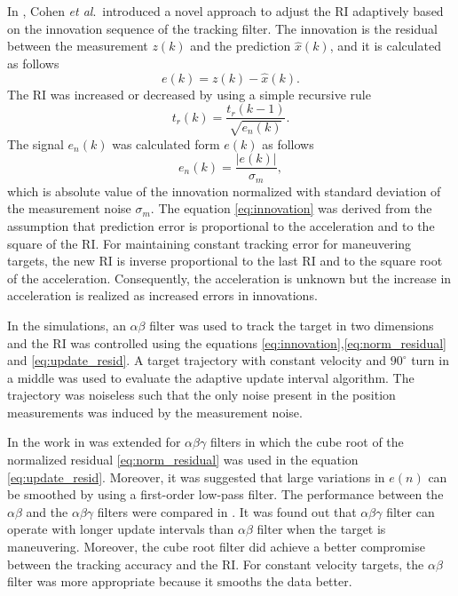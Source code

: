 \documentclass[english, 12pt, a4paper, elec, utf8, a-1b, online]{aaltothesis}
\newcommand{\etal}{\textit{et al}.~}
\begin{document}
In \cite{Cohen1986}, Cohen \etal introduced a novel approach to adjust the RI adaptively based on the innovation sequence of the tracking filter.
The innovation is the residual between the measurement $z(k)$ and the prediction $\hat{x}(k)$, and it is calculated as follows
\begin{equation}\label{eq:innovation}
    e(k) = z(k) - \hat{x}(k).
\end{equation}
The RI was increased or decreased by using a simple recursive rule 
\begin{equation}\label{eq:update_resid}
    t_r(k) = \frac{t_r(k-1)}{\sqrt{e_n(k)}}.
\end{equation}
The signal $e_n(k)$ was calculated form $e(k)$ as follows
\begin{equation}\label{eq:norm_residual}
    e_n(k) = \frac{|e(k)|}{\sigma_m},
\end{equation}
which is absolute value of the innovation normalized with standard deviation of the measurement noise $\sigma_m$.
The equation \eqref{eq:innovation} was derived from the assumption that prediction error is proportional to the acceleration and to the square of the RI.
For maintaining constant tracking error for maneuvering targets, the new RI is inverse proportional to the last RI and to the square root of the acceleration.
Consequently, the acceleration is unknown but the increase in acceleration is realized as increased errors in innovations.

In the simulations, an $\alpha \beta$ filter was used to track the target in two dimensions and the RI was controlled using the equations \eqref{eq:innovation},\eqref{eq:norm_residual} and \eqref{eq:update_resid}.
A target trajectory with constant velocity and $90^\circ$ turn in a middle was used to evaluate the adaptive update interval algorithm.
The trajectory was noiseless such that the only noise present in the position measurements was induced by the measurement noise. 

In \cite{Gardner1988} the work in \cite{Cohen1986} was extended for $\alpha\beta\gamma$ filters in which the cube root of the normalized residual \eqref{eq:norm_residual} was used in the equation \eqref{eq:update_resid}.
Moreover, it was suggested that large variations in $e(n)$ can be smoothed by using a first-order low-pass filter.
The performance between the $\alpha\beta$ and the $\alpha\beta\gamma$ filters were compared in \cite{Munu1992}.
It was found out that $\alpha\beta\gamma$ filter can operate with longer update intervals than $\alpha\beta$ filter when the target is maneuvering.
Moreover, the cube root filter did achieve a better compromise between the tracking accuracy and the RI.     
For constant velocity targets, the $\alpha\beta$ filter was more appropriate because it smooths the data better.
\end{document}
